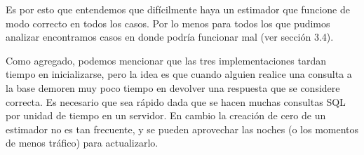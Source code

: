 Es por esto que entendemos que difícilmente haya un estimador que funcione de modo correcto en todos los casos. Por lo menos para todos los que pudimos analizar encontramos casos en donde podría funcionar mal (ver sección 3.4).

Como agregado, podemos mencionar que las tres implementaciones tardan tiempo en inicializarse, pero la idea es que cuando alguien realice una consulta a la base demoren muy poco tiempo en devolver una respuesta que se considere correcta. Es necesario que sea rápido dada que se hacen muchas consultas SQL por unidad de tiempo en un servidor. En cambio la creación de cero de un estimador no es tan frecuente, y se pueden aprovechar las noches (o los momentos de menos tráfico) para actualizarlo. 

